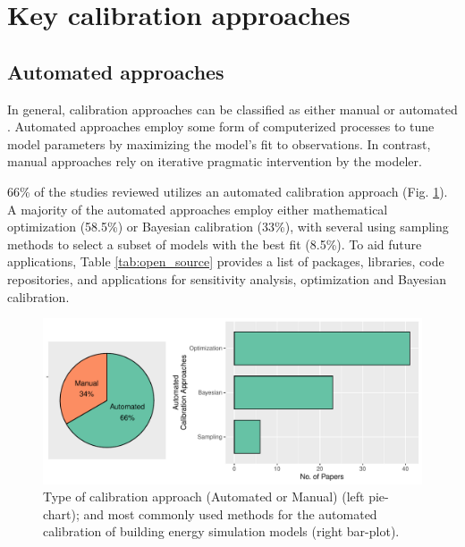 \documentclass[review]{elsarticle}
\begin{document}
\section{Key calibration approaches}

\subsection{Automated approaches}

In general, calibration approaches can be classified as either manual or automated \cite{coakley2014review}. Automated approaches employ some form of computerized processes to tune model parameters by maximizing the model's fit to observations. In contrast, manual approaches rely on iterative pragmatic intervention by the modeler. 

66\% of the studies reviewed utilizes an automated calibration approach (Fig. \ref{fig:auto_manual}). A majority of the automated approaches employ either mathematical optimization (58.5\%) or Bayesian calibration (33\%), with several using sampling methods to select a subset of models with the best fit (8.5\%). To aid future applications, Table \ref{tab:open_source} provides a list of packages, libraries, code repositories, and applications for sensitivity analysis, optimization and Bayesian calibration. 

\begin{figure}[!h]
\centering
\includegraphics[width=\textwidth]{figures/auto_manual.pdf}
\caption{Type of calibration approach (Automated or Manual) (left pie-chart); and most commonly used methods for the automated calibration of building energy simulation models (right bar-plot).}
\label{fig:auto_manual}
\end{figure}
\end{document}
